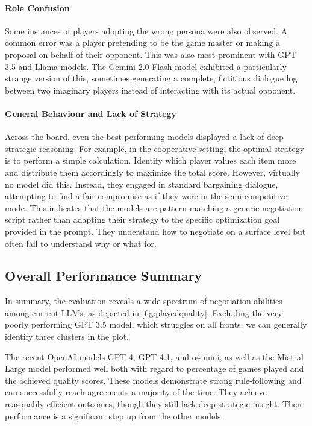 \paragraph{Role Confusion}
Some instances of players adopting the wrong persona were also observed. A common error was a player pretending to be the game master or making a proposal on behalf of their opponent. This was also most prominent with GPT 3.5 and Llama models. The Gemini 2.0 Flash model exhibited a particularly strange version of this, sometimes generating a complete, fictitious dialogue log between two imaginary players instead of interacting with its actual opponent.

\paragraph{General Behaviour and Lack of Strategy}
Across the board, even the best-performing models displayed a lack of deep strategic reasoning. For example, in the cooperative setting, the optimal strategy is to perform a simple calculation. Identify which player values each item more and distribute them accordingly to maximize the total score. However, virtually no model did this. Instead, they engaged in standard bargaining dialogue, attempting to find a fair compromise as if they were in the semi-competitive mode. This indicates that the models are pattern-matching a generic negotiation script rather than adapting their strategy to the specific optimization goal provided in the prompt. They understand how to negotiate on a surface level but often fail to understand why or what for.


\subsection{Overall Performance Summary}

In summary, the evaluation reveals a wide spectrum of negotiation abilities among current LLMs, as depicted in \cref{fig:playedquality}. Excluding the very poorly performing GPT 3.5 model, which struggles on all fronts, we can generally identify three clusters in the plot.

The recent OpenAI models GPT 4, GPT 4.1, and o4-mini, as well as the Mistral Large model performed well both with regard to percentage of games played and the achieved quality scores. These models demonstrate strong rule-following and can successfully reach agreements a majority of the time. They achieve reasonably efficient outcomes, though they still lack deep strategic insight. Their performance is a significant step up from the other models.

